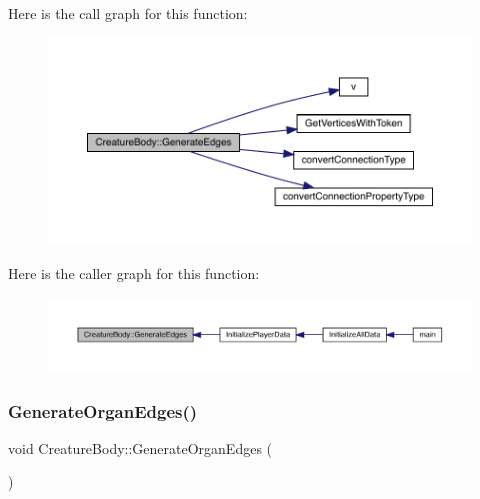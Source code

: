 Here is the call graph for this function\+:
\nopagebreak
\begin{figure}[H]
\begin{center}
\leavevmode
\includegraphics[width=350pt]{da/d7d/class_creature_body_a8feda2cfc35e1b76730a31eb368ffed6_cgraph}
\end{center}
\end{figure}
Here is the caller graph for this function\+:
\nopagebreak
\begin{figure}[H]
\begin{center}
\leavevmode
\includegraphics[width=350pt]{da/d7d/class_creature_body_a8feda2cfc35e1b76730a31eb368ffed6_icgraph}
\end{center}
\end{figure}
\mbox{\label{class_creature_body_af1303a40606bf06aed980f14e7027d54}} 
\subsubsection{\texorpdfstring{Generate\+Organ\+Edges()}{GenerateOrganEdges()}}
{\footnotesize\ttfamily void Creature\+Body\+::\+Generate\+Organ\+Edges (\begin{DoxyParamCaption}{ }\end{DoxyParamCaption})}

